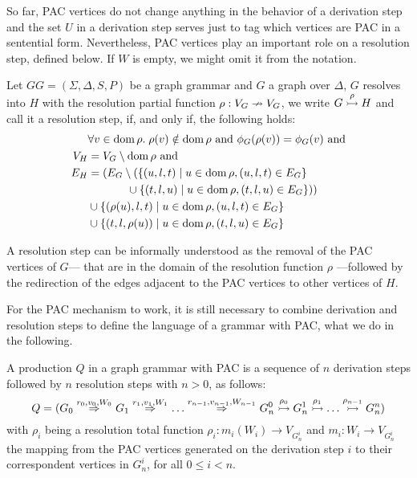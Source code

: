 So far, PAC vertices do not change anything in the behavior of a derivation step and the set $U$ in a derivation step serves just to tag which vertices are PAC in a sentential form. Nevertheless, PAC vertices play an important role on a resolution step, defined below. If $W$ is empty, we might omit it from the notation.

\begin{definition}
	\label{def:resolv}
	Let $GG = (\Sigma, \Delta, S, P)$ be a graph grammar and $G$ a graph over $\Delta$, $G$ resolves into $H$ with the resolution partial function $\rho: V_G \nrightarrow V_G$, we write $G \overset{\rho}{\rightarrowtail} H$ and call it a resolution step, if, and only if, the following holds:
	\begin{align*}
		& \forall v \in \operatorname{dom} \rho . \; \rho(v) \notin \operatorname{dom} \rho \text{ and } \phi_G(\rho(v)) = \phi_G(v) \text{ and}\\
		V_H & = V_G \setminus \operatorname{dom} \rho \text{ and}\\
		E_H & = (E_G \setminus (\{(u,l,t) \; | \; u \in \operatorname{dom} \rho, (u,l,t) \in E_G\} \\
			&\hspace{3.5em} \cup \{(t,l,u) \; | \; u \in \operatorname{dom} \rho, (t,l,u) \in E_G\}))\\
		    & \cup \{(\rho(u),l,t) \; | \; u \in \operatorname{dom} \rho, (u,l,t) \in E_G\} \\
		    & \cup \{(t,l,\rho(u)) \; | \; u \in \operatorname{dom} \rho, (t,l,u) \in E_G\}
	\end{align*}
\end{definition}

A resolution step can be informally understood as the removal of the PAC vertices of $G$--- that are in the domain of the resolution function $\rho$ ---followed by the redirection of the edges adjacent to the PAC vertices to other vertices of $H$.

For the PAC mechanism to work, it is still necessary to combine derivation and resolution steps to define the language of a grammar with PAC, what we do in the following.

\begin{definition}
	A production $Q$ in a graph grammar with PAC is a sequence of $n$ derivation steps followed by $n$ resolution steps with $n > 0$, as follows:
	\begin{equation*}
		Q = (G_0 \derivpac{r_0}{v_0}{W_0}{} G_1 \derivpac{r_1}{v_1}{W_1}{} \dots \derivpac{r_{n-1}}{v_{n-1}}{W_{n-1}}{} G_n^0 \resolv{\rho_0} G_n^1 \resolv{\rho_1} \dots \resolv{\rho_{n-1}} G_n^n)
	\end{equation*}
	with $\rho_i$ being a resolution total function $\rho_i : m_i(W_i) \to V_{G_n^i}$ and $m_i : W_i \to V_{G_n^i}$ the mapping from the PAC vertices generated on the derivation step $i$ to their correspondent vertices in $G_n^i$, for all $0 \le i < n$.
\end{definition}

